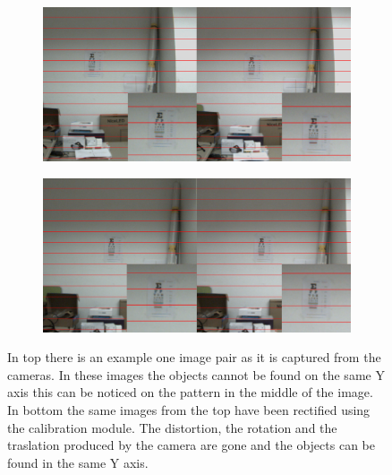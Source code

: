 \documentclass[10pt,a4paper,twocolumn,twoside]{article}
\begin{document}
	\begin{figure}
		\centering
		\begin{subfigure}[t]{0.5\textwidth}
			\centering
			\includegraphics[width=\linewidth]{img/regular2z.png}
			\label{fig:rec:regular}
		\end{subfigure}%
	\vspace{1cm}
		\begin{subfigure}[t]{0.5\textwidth}
			\centering
			\includegraphics[width=\linewidth]{img/rectified2z.png}
			\label{fig:rec:ractified}
		\end{subfigure}
		\caption{In top there is an example one image pair as it is captured from the cameras. In these images the objects cannot be found on the same Y axis this can be noticed on the pattern in the middle of the image. In bottom the same images from the top have been rectified using the calibration module. The distortion, the rotation and the traslation produced by the camera are gone and the objects can be found in the same Y axis. }
		\label{fig:rec}
	\end{figure}
\end{document}
